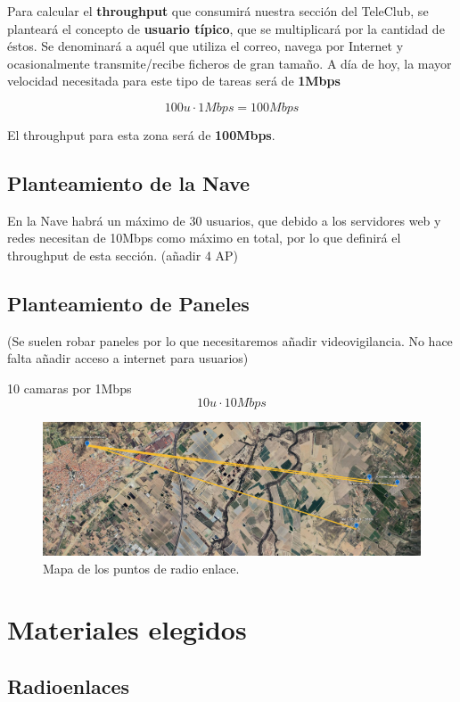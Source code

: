 \documentclass{article}
\begin{document}
Para calcular el \textbf{throughput} que consumirá nuestra sección del TeleClub, se planteará el concepto de \textbf{usuario típico}, que se multiplicará por la cantidad de éstos. Se denominará a aquél que utiliza el correo, navega por Internet y ocasionalmente transmite/recibe ficheros de gran tamaño. A día de hoy, la mayor velocidad necesitada para este tipo de tareas será de \textbf{1Mbps}

    $$100u \cdot 1Mbps = 100Mbps$$

El throughput para esta zona será de \textbf{100Mbps}.

\subsection{Planteamiento de la Nave}

En la Nave habrá un máximo de 30 usuarios, que debido a los servidores web y redes necesitan de 10Mbps como máximo en total, por lo que definirá el throughput de esta sección. (añadir 4 AP)

\subsection{Planteamiento de Paneles}

(Se suelen robar paneles por lo que necesitaremos añadir videovigilancia. No hace falta añadir acceso a internet para usuarios)

10 camaras por 1Mbps
$$10u \cdot 10Mbps$$

\begin{figure}[ht]
    \centering
    \includegraphics[width=0.8
    \linewidth]{src/earthpoints.png}
    \caption{\label{fig:earthpoints} Mapa de los puntos de radio enlace.}
\end{figure}

\section{Materiales elegidos}

\subsection{Radioenlaces}
\end{document}
